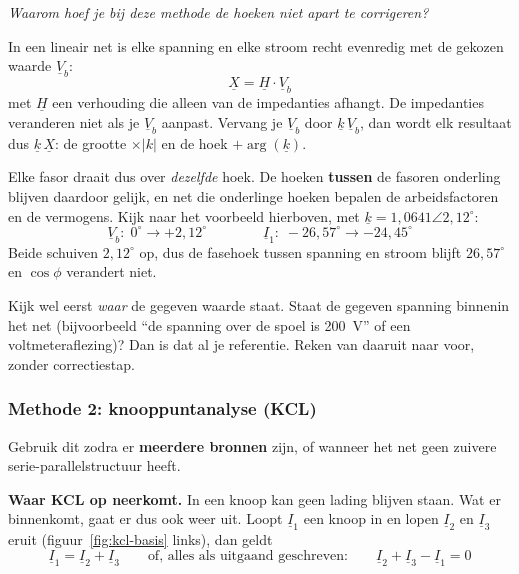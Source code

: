 \documentclass[a4paper,11pt]{article}
\begin{document}
\begin{examenbox}[EXAMENVRAAG:]
    \textit{Waarom hoef je bij deze methode de hoeken niet apart te corrigeren?}

    In een lineair net is elke spanning en elke stroom recht evenredig met de gekozen waarde
    $\underline{V}_b$:
    \[\underline{X} = \underline{H}\cdot\underline{V}_b\]
    met $\underline{H}$ een verhouding die alleen van de impedanties afhangt. De impedanties
    veranderen niet als je $\underline{V}_b$ aanpast. Vervang je $\underline{V}_b$ door
    $\underline{k}\,\underline{V}_b$, dan wordt elk resultaat dus $\underline{k}\,\underline{X}$:
    de grootte $\times |k|$ en de hoek $+\arg(\underline{k})$.

    Elke fasor draait dus over \emph{dezelfde} hoek. De hoeken \textbf{tussen} de fasoren onderling
    blijven daardoor gelijk, en net die onderlinge hoeken bepalen de arbeidsfactoren en de
    vermogens. Kijk naar het voorbeeld hierboven, met $\underline{k} = 1{,}0641\angle 2{,}12^\circ$:
    \[\underline{V}_b: \; 0^\circ \rightarrow +2{,}12^\circ
        \qquad\qquad
        \underline{I}_1: \; -26{,}57^\circ \rightarrow -24{,}45^\circ\]
    Beide schuiven $2{,}12^\circ$ op, dus de fasehoek tussen spanning en stroom blijft
    $26{,}57^\circ$ en $\cos\phi$ verandert niet.
\end{examenbox}

Kijk wel eerst \emph{waar} de gegeven waarde staat. Staat de gegeven spanning binnenin het net
(bijvoorbeeld ``de spanning over de spoel is 200~V'' of een voltmeteraflezing)? Dan is dat al je
referentie. Reken van daaruit naar voor, zonder correctiestap.

\subsubsection{Methode 2: knooppuntanalyse (KCL)}\label{sec:kcl}

Gebruik dit zodra er \textbf{meerdere bronnen} zijn, of wanneer het net geen zuivere
serie-parallelstructuur heeft.

\textbf{Waar KCL op neerkomt.} In een knoop kan geen lading blijven staan. Wat er binnenkomt, gaat
er dus ook weer uit. Loopt $\underline{I}_1$ een knoop in en lopen $\underline{I}_2$ en
$\underline{I}_3$ eruit (figuur~\ref{fig:kcl-basis} links), dan geldt
\[\underline{I}_1 = \underline{I}_2 + \underline{I}_3
    \qquad\text{of, alles als uitgaand geschreven:}\qquad
    \underline{I}_2 + \underline{I}_3 - \underline{I}_1 = 0\]
\end{document}
